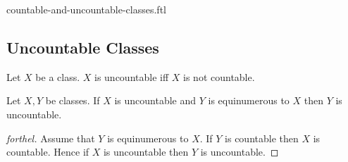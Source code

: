\documentclass{naproche-library}
\begin{document}
\begin{smodule}{countable-and-uncountable-classes.ftl}
  \subsection*{Uncountable Classes}

  \begin{definition}[forthel,id=FOUNDATIONS_14_2411928395710464]
    Let $X$ be a class.
    $X$ is uncountable iff $X$ is not countable.
  \end{definition}

  \begin{proposition}[forthel,id=FOUNDATIONS_14_1073385358491648]
    Let $X, Y$ be classes.
    If $X$ is uncountable and $Y$ is equinumerous to $X$ then $Y$ is uncountable.
  \end{proposition}
  \begin{proof}[forthel]
    Assume that $Y$ is equinumerous to $X$.
    If $Y$ is countable then $X$ is countable.
    Hence if $X$ is uncountable then $Y$ is uncountable.
  \end{proof}
\end{smodule}
\end{document}

